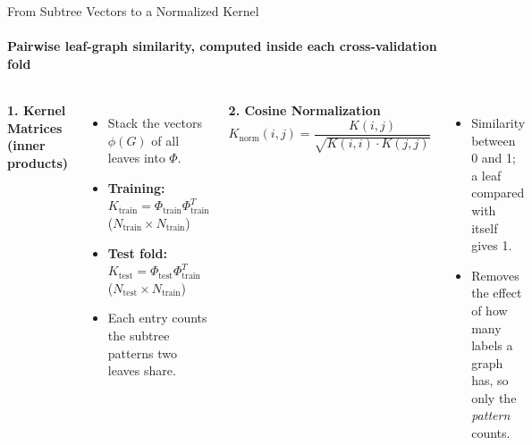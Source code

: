 \documentclass[aspectratio=169, 11pt]{beamer}
\begin{document}
\begin{frame}{From Subtree Vectors to a Normalized Kernel}
    \framesubtitle{Pairwise leaf-graph similarity, computed inside each cross-validation fold \cite{shervashidze2011weisfeiler, scholkopf2002learning}}

    \begin{columns}[T]
        \textbf{1. Kernel Matrices (inner products)}
        \vspace{0.1cm}
        \begin{itemize}\footnotesize
            \item Stack the vectors $\phi(G)$ of all leaves into $\Phi$.
            \item \textbf{Training:} $K_{\text{train}} = \Phi_{\text{train}} \Phi_{\text{train}}^T$ \quad ($N_{\text{train}} \times N_{\text{train}}$)
            \item \textbf{Test fold:} $K_{\text{test}} = \Phi_{\text{test}} \Phi_{\text{train}}^T$ \quad ($N_{\text{test}} \times N_{\text{train}}$)
            \item Each entry counts the subtree patterns two leaves share.
        \end{itemize}

        \textbf{2. Cosine Normalization \cite{scholkopf2002learning}}
        \vspace{-0.1cm}
        \begin{equation*}
            K_{\text{norm}}(i,j) = \frac{K(i,j)}{\sqrt{K(i,i) \cdot K(j,j)}}
        \end{equation*}
        \vspace{-0.2cm}
        \begin{itemize}\footnotesize
            \item Similarity between 0 and 1; a leaf compared with itself gives 1.
            \item Removes the effect of how many labels a graph has, so only the \emph{pattern} counts.
        \end{itemize}
    \end{columns}


\end{frame}
\end{document}
